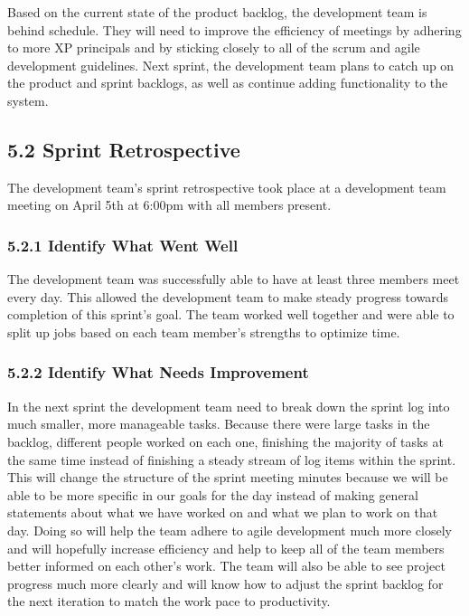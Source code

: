 \documentclass[]{article}
\begin{document}
Based on the current state of the product backlog, the development team
is behind schedule. They will need to improve the efficiency of meetings
by adhering to more XP principals and by sticking closely to all of the
scrum and agile development guidelines. Next sprint, the development
team plans to catch up on the product and sprint backlogs, as well as
continue adding functionality to the system.

\subsection{5.2 Sprint Retrospective}\label{sprint-retrospective}

The development team's sprint retrospective took place at a development
team meeting on April 5th at 6:00pm with all members present.

\subsubsection{5.2.1 Identify What Went
Well}\label{identify-what-went-well}

The development team was successfully able to have at least three
members meet every day. This allowed the development team to make steady
progress towards completion of this sprint's goal. The team worked well
together and were able to split up jobs based on each team member's
strengths to optimize time.

\subsubsection{5.2.2 Identify What Needs
Improvement}\label{identify-what-needs-improvement}

In the next sprint the development team need to break down the sprint
log into much smaller, more manageable tasks. Because there were large
tasks in the backlog, different people worked on each one, finishing the
majority of tasks at the same time instead of finishing a steady stream
of log items within the sprint. This will change the structure of the
sprint meeting minutes because we will be able to be more specific in
our goals for the day instead of making general statements about what we
have worked on and what we plan to work on that day. Doing so will help
the team adhere to agile development much more closely and will
hopefully increase efficiency and help to keep all of the team members
better informed on each other's work. The team will also be able to see
project progress much more clearly and will know how to adjust the
sprint backlog for the next iteration to match the work pace to
productivity.
\end{document}
